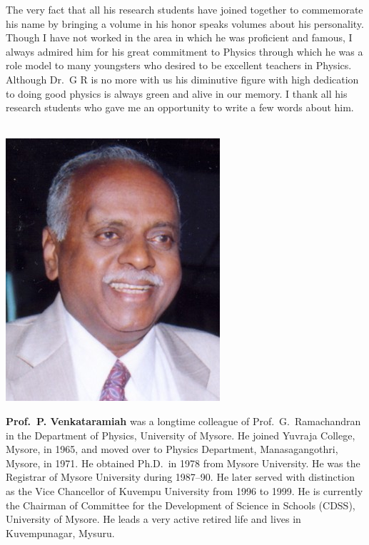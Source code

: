 The very fact that all his research students have joined together to commemorate his name by bringing a volume in his honor speaks volumes about his personality. Though I have not worked in the area in which he was proficient and famous, I always admired him for his great commitment to Physics through which he was a role model to many youngsters who desired to be excellent teachers in Physics. Although Dr.\ G R is no more with us his diminutive figure with high dedication to doing good physics is always green and alive in our memory. I thank all his research students who gave me an opportunity to write a few words about him.
\medskip

\noindent
\begin{minipage}[t]{3cm}%
\phantom{i}\\[-2.8cm]%
\includegraphics{authorsphotos/Prof_P_Venkataramaiah.jpg}
\end{minipage}
\begin{minipage}{7cm}
\textbf{Prof.\ P. Venkataramiah} was a longtime colleague of Prof.\ G.\ Ramachandran in the Department of Physics, University of Mysore. He joined Yuvraja College, Mysore, in 1965, and moved over to Physics Department, Manasagangothri, Mysore, in 1971. He obtained Ph.D.\ in 1978 from Mysore University. He was the Registrar of Mysore University during 1987--90. He later served with distinction as the Vice Chancellor of Kuvempu University from 1996 to 1999. He is currently the Chairman of Committee for the Development of Science in Schools (CDSS), University of Mysore. He leads a very active retired life and lives in Kuvempunagar, Mysuru.
\end{minipage}

